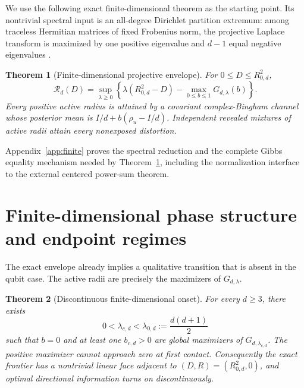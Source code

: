 \documentclass[11pt,a4paper]{article}
\newtheorem{theorem}{Theorem}[section]
\theoremstyle{remark}
\newcommand{\cR}{\mathcal{R}}
\begin{document}
We use the following exact finite-dimensional theorem as the starting point.
Its nontrivial spectral input is an all-degree Dirichlet partition extremum:
among traceless Hermitian matrices of fixed Frobenius norm, the projective
Laplace transform is maximized by one positive eigenvalue and $d-1$ equal
negative eigenvalues \cite{BrazitikosPandis2025}.

\begin{theorem}[Finite-dimensional projective envelope]
\label{thm:finite-envelope}
For $0\le D\le R_{0,d}^2$,
\begin{equation}
 \cR_d(D)=\sup_{\lambda\ge0}
 \left\{\lambda(R_{0,d}^2-D)
 -\max_{0\le b\le1}G_{d,\lambda}(b)\right\}.
 \label{eq:finite-envelope}
\end{equation}
Every positive active radius is attained by a covariant complex-Bingham
channel whose posterior mean is
$I/d+b(\rho_u-I/d)$.  Independent revealed mixtures of active radii attain
every nonexposed distortion.
\end{theorem}

Appendix~\ref{app:finite} proves the spectral reduction and the complete Gibbs
equality mechanism needed by Theorem~\ref{thm:finite-envelope}, including the
normalization interface to the external centered power-sum theorem.

\section{Finite-dimensional phase structure and endpoint regimes}
\label{sec:finite-phase}

The exact envelope already implies a qualitative transition that is absent in
the qubit case.  The active radii are precisely the maximizers of
$G_{d,\lambda}$.

\begin{theorem}[Discontinuous finite-dimensional onset]
\label{thm:finite-first-order}
For every $d\ge3$, there exists
\begin{equation}
 0<\lambda_{c,d}<\lambda_{0,d}:=\frac{d(d+1)}2
 \label{eq:finite-lambdac}
\end{equation}
such that $b=0$ and at least one $b_{c,d}>0$ are global maximizers of
$G_{d,\lambda_{c,d}}$.  The positive maximizer cannot approach zero at first
contact.  Consequently the exact frontier has a nontrivial linear face
adjacent to $(D,R)=(R_{0,d}^2,0)$, and optimal directional information turns
on discontinuously.
\end{theorem}
\end{document}

